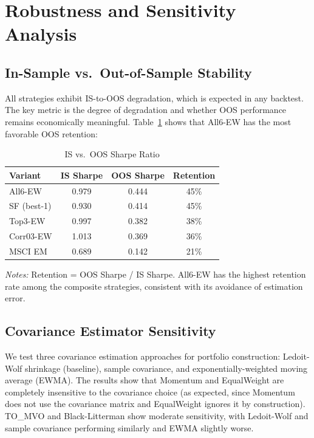 \documentclass[12pt,a4paper]{article}
\begin{document}
\section{Robustness and Sensitivity Analysis}
\label{sec:robustness}

\subsection{In-Sample vs.\ Out-of-Sample Stability}

All strategies exhibit IS-to-OOS degradation, which is expected in any backtest. The key metric is the degree of degradation and whether OOS performance remains economically meaningful. Table~\ref{tab:is_oos} shows that All6-EW has the most favorable OOS retention:

\begin{table}[H]
\centering
\caption{IS vs.\ OOS Sharpe Ratio}
\label{tab:is_oos}
\small
\begin{tabular}{lccc}
\toprule
\textbf{Variant} & \textbf{IS Sharpe} & \textbf{OOS Sharpe} & \textbf{Retention} \\
\midrule
All6-EW     & 0.979 & 0.444 & 45\% \\
SF (best-1) & 0.930 & 0.414 & 45\% \\
Top3-EW     & 0.997 & 0.382 & 38\% \\
Corr03-EW   & 1.013 & 0.369 & 36\% \\
MSCI EM     & 0.689 & 0.142 & 21\% \\
\bottomrule
\end{tabular}
\begin{minipage}{\textwidth}
\vspace{0.3em}
\footnotesize
\textit{Notes:} Retention = OOS Sharpe / IS Sharpe. All6-EW has the highest retention rate among the composite strategies, consistent with its avoidance of estimation error.
\end{minipage}
\end{table}

\subsection{Covariance Estimator Sensitivity}

We test three covariance estimation approaches for portfolio construction: Ledoit-Wolf shrinkage (baseline), sample covariance, and exponentially-weighted moving average (EWMA). The results show that Momentum and EqualWeight are completely insensitive to the covariance choice (as expected, since Momentum does not use the covariance matrix and EqualWeight ignores it by construction). TO\_MVO and Black-Litterman show moderate sensitivity, with Ledoit-Wolf and sample covariance performing similarly and EWMA slightly worse.
\end{document}
